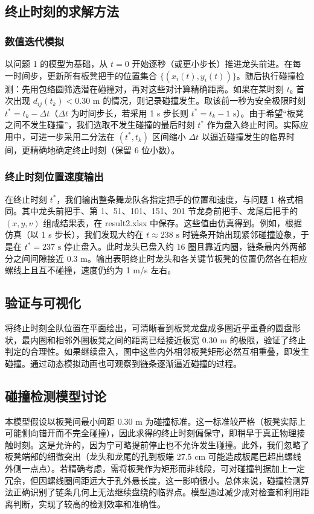\documentclass[UTF8]{ctexart}
\begin{document}
\subsection{终止时刻的求解方法}

\subsubsection{数值迭代模拟}
以问题 1 的模型为基础，从 $t=0$ 开始逐秒（或更小步长）推进龙头前进。在每一时间步，更新所有板凳把手的位置集合 $\{(x_i(t),y_i(t))\}$。随后执行碰撞检测：先用包络圆筛选潜在碰撞对，再对这些对计算精确距离。如果在某时刻 $t_k$ 首次出现 $d_{ij}(t_k)<0.30$ m 的情况，则记录碰撞发生。取该前一秒为安全极限时刻 $t^* = t_k - \Delta t$（$\Delta t$ 为时间步长，若采用 1 s 步长则 $t^*=t_k-1\text{ s}$）。由于希望“板凳之间不发生碰撞”，我们选取不发生碰撞的最后时刻 $t^*$ 作为盘入终止时间。实际应用中，可进一步采用二分法在 $(t^*, t_k)$ 区间缩小 $\Delta t$ 以逼近碰撞发生的临界时间，更精确地确定终止时刻（保留 6 位小数）。

\subsubsection{终止时刻位置速度输出}
在终止时刻 $t^*$，我们输出整条舞龙队各指定把手的位置和速度，与问题 1 格式相同。其中龙头前把手、第 1、51、101、151、201 节龙身前把手、龙尾后把手的 $(x,y,v)$ 组成结果表，在 result2.xlsx 中保存。这些值由仿真得到。例如，根据仿真（以 1 s 步长），我们发现大约在 $t\approx 238\text{ s}$ 时链条开始出现紧邻碰撞迹象，于是在 $t^*=237\text{ s}$ 停止盘入。此时龙头已盘入约 16 圈且靠近内圈，链条最内外两部分之间间隙接近 0.3 m。输出表明终止时龙头和各关键节板凳的位置仍然各在相应螺线上且互不碰撞，速度仍约为 1 m/s 左右。

\subsection{验证与可视化}
将终止时刻全队位置在平面绘出，可清晰看到板凳龙盘成多圈近乎重叠的圆盘形状，最内圈和相邻外圈板凳之间的距离已经接近板宽 0.30 m 的极限，验证了终止判定的合理性。如果继续盘入，图中这些内外相邻板凳矩形必然互相重叠，即发生碰撞。通过动态模拟动画也可观察到链条逐渐逼近碰撞的过程。

\subsection{碰撞检测模型讨论}
本模型假设以板凳间最小间距 0.30 m 为碰撞标准。这一标准较严格（板凳实际上可能侧向错开而不完全碰撞），因此求得的终止时刻偏保守，即稍早于真正物理接触时刻。这是允许的，因为宁可略提前停止也不允许发生碰撞。此外，我们忽略了板凳端部的细微突出（龙头和龙尾的孔到板端 27.5 cm 可能造成板尾巴超出螺线外侧一点点）。若精确考虑，需将板凳作为矩形而非线段，可对碰撞判据加上一定冗余，但因螺线圈间距远大于孔外悬长度，这一影响很小。总体来说，碰撞检测算法正确识别了链条几何上无法继续盘绕的临界点。模型通过减少成对检查和利用距离判断，实现了较高的检测效率和准确性。
\end{document}
